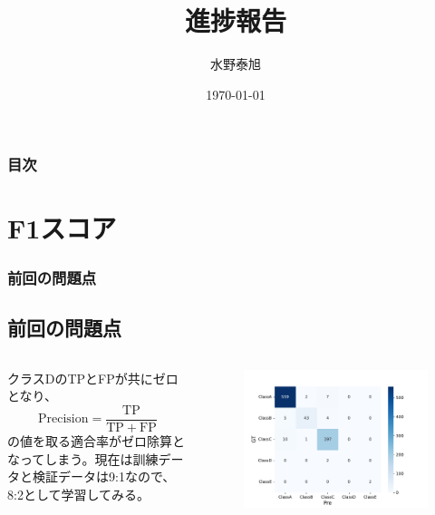 \documentclass[leno,xcolor=dvipsnames]{beamer}
\title{進捗報告}
\date{\today}
\author{水野泰旭}
\institute{弘前大学理工学部電子情報工学科4年}
\begin{document}
  \maketitle
  \begin{frame}
    \frametitle{目次}
    \tableofcontents
  \end{frame}
  \section{F1スコア}
  \begin{frame}
    \frametitle{前回の問題点}
    \subsection{前回の問題点}
    \begin{columns}
      \begin{column}{0.48\textwidth}
          クラスDのTPとFPが共にゼロとなり、
          \[\mathrm{Precision} = \frac{\mathrm{TP}}{\mathrm{TP} + \mathrm{FP}}\]
          の値を取る適合率がゼロ除算となってしまう。現在は訓練データと検証データは9:1なので、8:2として学習してみる。
      \end{column}
      \begin{column}{0.48\textwidth}
        \begin{figure}[H]
          \centering
          \includegraphics[keepaspectratio, scale=0.35]{images/deepimfam_confusion_matrix_cnt.pdf}
        \end{figure}
      \end{column}
    \end{columns}
  \end{frame}
\end{document}
